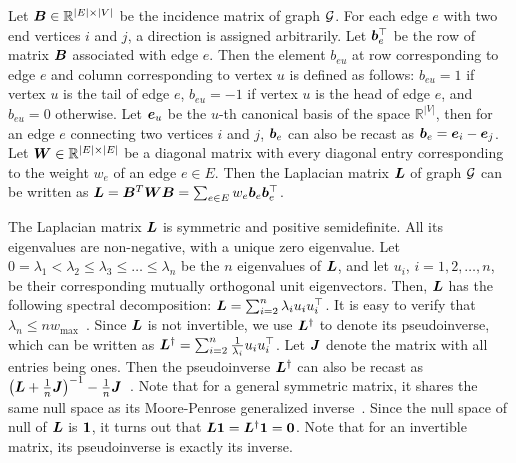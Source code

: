 \documentclass[10pt,twocolumn,twoside]{IEEEtran}
\begin{document}
Let \(\boldsymbol{B} \in \mathbb{R}^{|E| \times |V|}\) be the incidence matrix of graph \(\mathcal{G}\). For each edge \(e\) with two end vertices \(i\) and \(j\), a direction is assigned arbitrarily. Let \(\boldsymbol{b}_e^\top\) be the row of matrix \(\boldsymbol{B}\) associated with edge \(e\). Then the element \(b_{eu}\) at row corresponding to edge \(e\) and column corresponding to vertex \(u\) is defined as follows: \(b_{eu} = 1\) if vertex \(u\) is the tail of edge \(e\), \(b_{eu}=-1\) if vertex \(u\) is the head of  edge \(e\), and \(b_{eu}=0\) otherwise. Let \(\boldsymbol{e}_u\) be the \(u\)-th canonical basis of the space \(\mathbb{R}^{|V|}\), then for an edge \(e\) connecting two vertices \(i\) and \(j\), \(\boldsymbol{b}_e\) can also be recast as \(\boldsymbol{b}_e=\boldsymbol{e}_{i}-\boldsymbol{e}_{j}\).  Let  \(\boldsymbol{W} \in \mathbb{R}^{|E| \times |E|}\) be a diagonal matrix with every diagonal entry corresponding to the weight  \(w_e\) of an edge  $e\in E$. Then the Laplacian matrix \(\boldsymbol{L}\) of graph \(\mathcal{G}\) can be written as \(\boldsymbol{L}=\boldsymbol{B}^T\boldsymbol{W}\boldsymbol{B}=\sum_{e\in E}w_e\boldsymbol{b}_e\boldsymbol{b}_e^{\top}\).

The Laplacian matrix \(\boldsymbol{L}\) is symmetric and positive semidefinite. All  its eigenvalues  are non-negative, with a unique zero eigenvalue. Let \(0=\lambda_1< \lambda_2 \leq \lambda_3\leq \dots\leq \lambda_{n}\) be the \(n\) eigenvalues of  \(\boldsymbol{L}\), and let \(u_i\), \( i={1,2,\dots,n}\), be their corresponding mutually orthogonal  unit eigenvectors. Then, \(\boldsymbol{L}\) has the following spectral decomposition:  \(\boldsymbol{L}=\sum_{i=2}^{n}\lambda_i u_iu_i^\top\).  It is easy to verify that \( \lambda_{n}\leq n w_{\max}\)~\cite{LiSc18}.
Since \(\boldsymbol{L}\) is not invertible, we use \(\boldsymbol{L}^{\dagger}\) to denote its pseudoinverse, which can be written as \(\boldsymbol{L}^{\dagger}=\sum_{i=2}^{n}\frac{1}{\lambda_i}u_iu_i^{\top}\). Let \(\boldsymbol{J}\) denote the matrix with all entries being ones. Then the pseudoinverse \(\boldsymbol{L}^{\dagger}\) can also be recast as \(\left( \boldsymbol{L} +\frac{1}{n}\boldsymbol{J} \right)^{-1} - \frac{1}{n}\boldsymbol{J}\)~\cite{GhBoSa08}. Note that for a general symmetric matrix, it shares the same null space as its Moore-Penrose generalized inverse~\cite{BeGrTh74}.
Since the  null space of  null of \({\boldsymbol{L}}\) is \( \boldsymbol{1}\),  it turns out that \({\boldsymbol{L}} \boldsymbol{1} ={\boldsymbol{L}}^{\dagger} \boldsymbol{1} =\mathbf{0}\). Note that for an invertible matrix, its pseudoinverse is exactly its inverse.

\end{document}
